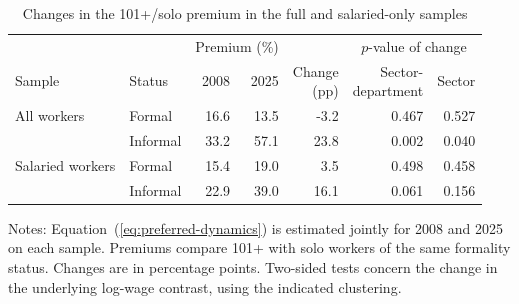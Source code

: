 \begin{table}[!htbp]
  \centering\small
  \caption{Changes in the 101+/solo premium in the full and salaried-only samples}
  \label{tab:salaried-dynamic-comparison}
  \setlength{\tabcolsep}{5pt}
  \begin{tabular}{@{}llrrrrr@{}}
    \toprule
    & & \multicolumn{2}{c}{Premium (\%)} & & \multicolumn{2}{c}{$p$-value of change} \\
    \cmidrule(lr){3-4}\cmidrule(lr){6-7}
    Sample & Status & 2008 & 2025 & \shortstack{Change\\(pp)} & \shortstack{Sector-\\department} & Sector \\
    \midrule
    All workers & Formal & 16.6 & 13.5 & -3.2 & 0.467 & 0.527 \\
     & Informal & 33.2 & 57.1 & 23.8 & 0.002 & 0.040 \\
    \midrule
    Salaried workers & Formal & 15.4 & 19.0 & 3.5 & 0.498 & 0.458 \\
     & Informal & 22.9 & 39.0 & 16.1 & 0.061 & 0.156 \\
    \bottomrule
  \end{tabular}
  \par\vspace{0.4em}
  \begin{minipage}{0.97\textwidth}\footnotesize
  Notes: Equation~(\ref{eq:preferred-dynamics}) is estimated jointly for 2008 and 2025 on each sample. Premiums compare 101+ with solo workers of the same formality status. Changes are in percentage points. Two-sided tests concern the change in the underlying log-wage contrast, using the indicated clustering.
  \end{minipage}
\end{table}
